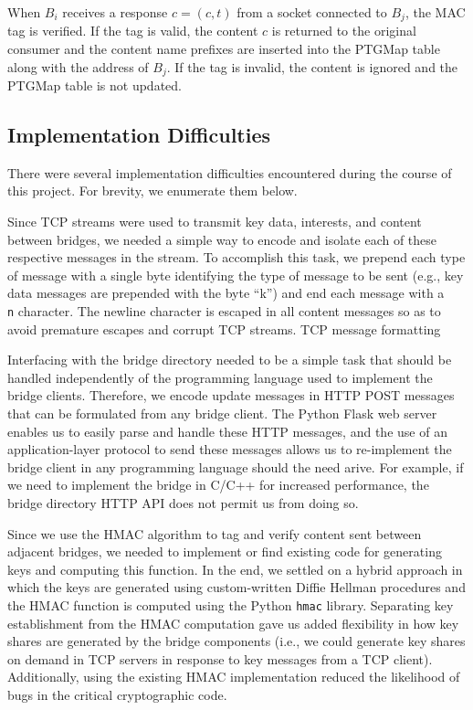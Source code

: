 When $B_i$ receives a response $c = (c,t)$ from a socket connected to $B_j$, the MAC tag is verified. If the tag is valid, the content $c$ is returned to the original consumer and the content name prefixes are inserted into the {\sf PTGMap} table along with the address of $B_j$. If the tag is invalid, the content is ignored and the {\sf PTGMap} table is not updated. 

\subsection{Implementation Difficulties}
There were several implementation difficulties encountered during the course of this project. For brevity, we enumerate them below.
\begin{compactenum}
	\item Since TCP streams were used to transmit key data, interests, and content between bridges, we needed a simple way to encode and isolate each of these respective messages in the stream. To accomplish this task, we prepend each type of message with a single byte identifying the type of message to be sent (e.g., key data messages are prepended with the byte ``k'') and end each message with a {\tt \\n} character. The newline character is escaped in all content messages so as to avoid premature escapes and corrupt TCP streams.
	TCP message formatting
	\item Interfacing with the bridge directory needed to be a simple task that should be handled independently of the programming language used to implement the bridge clients. Therefore, we encode update messages in HTTP POST messages that can be formulated from any bridge client. The Python Flask web server enables us to easily parse and handle these HTTP messages, and the use of an application-layer protocol to send these messages allows us to re-implement the bridge client in any programming language should the need arive. For example, if we need to implement the bridge in C/C++ for increased performance, the bridge directory HTTP API does not permit us from doing so.
	\item Since we use the HMAC algorithm to tag and verify content sent between adjacent bridges, we needed to implement or find existing code for generating keys and computing this function. In the end, we settled on a hybrid approach in which the keys are generated using custom-written Diffie Hellman procedures and the HMAC function is computed using the Python {\tt hmac} library. Separating key establishment from the HMAC computation gave us added flexibility in how key shares are generated by the bridge components (i.e., we could generate key shares on demand in TCP servers in response to key messages from a TCP client). Additionally, using the existing HMAC implementation reduced the likelihood of bugs in the critical cryptographic code.
\end{compactenum}